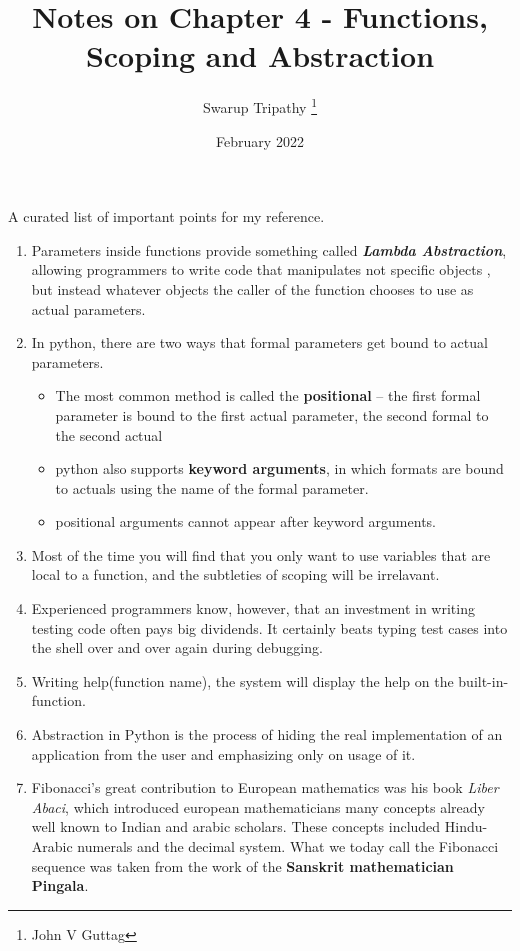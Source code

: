 \documentclass[11pt]{article}
\title{Notes on Chapter 4 - Functions, Scoping and Abstraction}
\author{Swarup Tripathy \thanks{John V Guttag}}
\date{February 2022}
\begin{document}
    \maketitle
    A curated list of important points for my reference.
    \begin{enumerate}
        \item Parameters inside functions provide something called \textbf{\textit{Lambda Abstraction}}, allowing programmers to write code that manipulates not specific objects
        , but instead whatever objects the caller of the function chooses to use as actual parameters.
        \item In python, there are two ways that formal parameters get bound to actual parameters. 
        \begin{itemize}
            \item The most common method is called the \textbf{positional} -- the first formal parameter is bound to the first actual parameter, the second formal to the second actual
            \item python also supports \textbf{keyword arguments}, in which formats are bound to actuals using the name of the formal parameter.
            \item positional arguments cannot appear after keyword arguments.
        \end{itemize}
        \item Most of the time you will find that you only want to use variables that are local to a function, and the subtleties of scoping will be irrelavant.
        \item Experienced programmers know, however, that an investment in writing testing code often pays big dividends. It certainly beats typing test cases into the shell over and over again during debugging.
        \item Writing help(function name), the system will display the help on the built-in-function.
        \item Abstraction in Python is the process of hiding the real implementation of an application from the user and emphasizing only on usage of it.
        \item Fibonacci's great contribution to European mathematics was his book \textit{Liber Abaci}, which introduced european mathematicians many concepts already well known to Indian and arabic scholars. 
        These concepts included Hindu-Arabic numerals and the decimal system. What we today call the Fibonacci sequence was taken from the work of the \textbf{Sanskrit mathematician Pingala}.

\end{enumerate}
\end{document}
